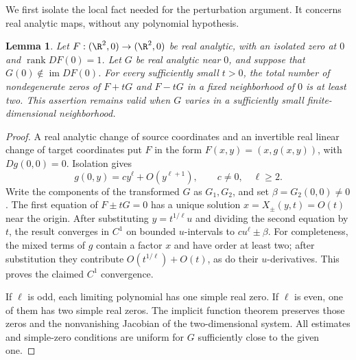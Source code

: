 \documentclass[UTF8,11pt]{ctexart}
\newtheorem{lem}[thm]{Lemma}
\theoremstyle{definition}
\numberwithin{equation}{section}
\DeclareMathOperator{\rank}{rank}\DeclareMathOperator{\tr}{tr}\DeclareMathOperator{\Tr}{Tr}
\begin{document}
We first isolate the local fact needed for the perturbation argument.
It concerns real analytic maps, without any polynomial hypothesis.
\begin{lem}\label{b:lem:rankone}
Let $F:(\R^2,0)\to(\R^2,0)$ be real analytic, with an isolated zero
at $0$ and $\rank DF(0)=1$. Let $G$ be real analytic near $0$, and
suppose that $G(0)\notin\operatorname{im}DF(0)$.
For every sufficiently small $t>0$, the total number of nondegenerate
zeros of $F+tG$ and $F-tG$ in a fixed neighborhood of $0$ is at least
two. This assertion remains valid when $G$ varies in a sufficiently
small finite-dimensional neighborhood.
\end{lem}
\begin{proof}
A real analytic change of source coordinates and an invertible real
linear change of target coordinates put $F$ in the form
$F(x,y)=(x,g(x,y))$, with $Dg(0,0)=0$. Isolation gives
\[
 g(0,y)=cy^\ell+O(y^{\ell+1}),\qquad c\ne0,\quad\ell\ge2.
\]
Write the components of the transformed $G$ as $G_1,G_2$, and set
$\beta=G_2(0,0)\ne0$. The first equation of $F\pm tG=0$ has a unique
solution $x=X_\pm(y,t)=O(t)$ near the origin. After substituting
$y=t^{1/\ell}u$ and dividing the second equation by $t$, the result
converges in $C^1$ on bounded $u$-intervals to $cu^\ell\pm\beta$.
For completeness, the mixed terms of $g$ contain a factor $x$ and have
order at least two; after substitution they contribute
$O(t^{1/\ell})+O(t)$, as do their $u$-derivatives. This proves the
claimed $C^1$ convergence.

If $\ell$ is odd, each limiting polynomial has one simple real zero.
If $\ell$ is even, one of them has two simple real zeros. The implicit
function theorem preserves those zeros and the nonvanishing Jacobian
of the two-dimensional system. All estimates and simple-zero
conditions are uniform for $G$ sufficiently close to the given one.
\end{proof}
\end{document}
